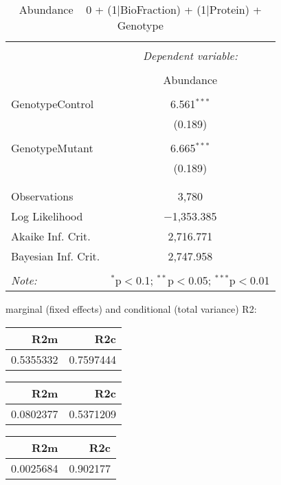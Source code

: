 \documentclass[11pt]{report}
\begin{document}
\begin{table}[!htbp] \centering 
  \caption{Abundance ~ 0 + (1|BioFraction) + (1|Protein) + Genotype} 
  \label{} 
\begin{tabular}{@{\extracolsep{5pt}}lc} 
\\[-1.8ex]\hline 
\hline \\[-1.8ex] 
 & \multicolumn{1}{c}{\textit{Dependent variable:}} \\ 
\cline{2-2} 
\\[-1.8ex] & Abundance \\ 
\hline \\[-1.8ex] 
 GenotypeControl & 6.561$^{***}$ \\ 
  & (0.189) \\ 
  & \\ 
 GenotypeMutant & 6.665$^{***}$ \\ 
  & (0.189) \\ 
  & \\ 
\hline \\[-1.8ex] 
Observations & 3,780 \\ 
Log Likelihood & $-$1,353.385 \\ 
Akaike Inf. Crit. & 2,716.771 \\ 
Bayesian Inf. Crit. & 2,747.958 \\ 
\hline 
\hline \\[-1.8ex] 
\textit{Note:}  & \multicolumn{1}{r}{$^{*}$p$<$0.1; $^{**}$p$<$0.05; $^{***}$p$<$0.01} \\ 
\end{tabular} 
\end{table} 
marginal (fixed effects) and conditional (total variance) R2:

\begin{tabular}{r|r}
\hline
R2m & R2c\\
\hline
0.5355332 & 0.7597444\\
\hline
\end{tabular}

\begin{tabular}{r|r}
\hline
R2m & R2c\\
\hline
0.0802377 & 0.5371209\\
\hline
\end{tabular}

\begin{tabular}{r|r}
\hline
R2m & R2c\\
\hline
0.0025684 & 0.902177\\
\hline
\end{tabular}
\end{document}
